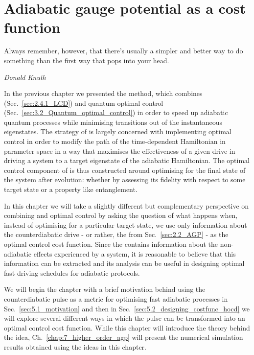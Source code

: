 \chapter{Adiabatic gauge potential as a cost function}\label{chap:5_cd_as_costfunc}

\epigraph{Always remember, however, that there’s usually a simpler and better way to do something than the first way that pops into your head.}{\emph{Donald Knuth}}

In the previous chapter we presented the  method, which combines  (Sec.~\ref{sec:2.4.1_LCD}) and quantum optimal control (Sec.~\ref{sec:3.2_Quantum_optimal_control}) in order to speed up adiabatic quantum processes while minimising transitions out of the instantaneous eigenstates. The strategy of  is largely concerned with implementing optimal control in order to modify the path of the time-dependent Hamiltonian in parameter space in a way that maximises the effectiveness of a given  drive in driving a system to a target eigenstate of the adiabatic Hamiltonian. The optimal control component of  is thus constructed around optimising for the final state of the system after evolution: whether by assessing its fidelity with respect to some target state or a property like entanglement.

In this chapter we will take a slightly different but complementary perspective on combining  and optimal control by asking the question of what happens when, instead of optimising for a particular target state, we use only information about the counterdiabatic drive - or rather, the  from Sec.~\ref{sec:2.2_AGP} - as the optimal control cost function. Since the  contains information about the non-adiabatic effects experienced by a system, it is reasonable to believe that this information can be extracted and its analysis can be useful in designing optimal fast driving schedules for adiabatic protocols. 

We will begin the chapter with a brief motivation behind using the counterdiabatic pulse as a metric for optimising fast adiabatic processes in Sec.~\ref{sec:5.1_motivation} and then in Sec.~\ref{sec:5.2_designing_costfunc_hocd} we will explore several different ways in which the  pulse can be transformed into an optimal control cost function. While this chapter will introduce the theory behind the idea, Ch.~\ref{chap:7_higher_order_agp} will present the numerical simulation results obtained using the ideas in this chapter.

